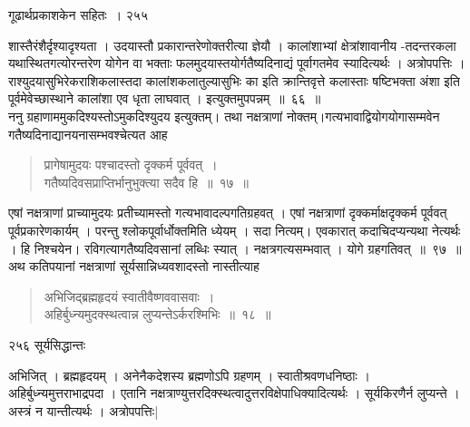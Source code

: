 \documentclass[11pt, openany]{book}
\begin{document}
\newpage


\hspace{3cm} गूढार्थप्रकाशकेन सहितः~। \hfill २५५
\vspace{1cm}


\noindent शास्तैरंशैर्दृश्यादृश्यता । उदयास्तौ प्रकारान्तरेणोक्तरीत्या ज्ञेयौ । कालांशाभ्यां क्षेत्रांशावानीय -तदन्तरकला यथास्थितगत्योरन्तरेण योगेन वा भक्ताः फलमुदयास्तयोर्गतैष्यदिनाद्यं पूर्वागतमेव स्यादित्यर्थः । अत्रोपपत्तिः । राश्युदयासुभिरेकराशिकलास्तदा कालांशकलातुल्यासुभिः का इति क्रान्तिवृत्ते कलास्ताः षष्टिभक्ता अंशा इति पूर्वमेवेच्छास्थाने कालांशा एव धृता लाघवात् । इत्युक्तमुपपन्नम्~॥~६६~॥\\
\noindent ननु ग्रहाणाममुकदिश्यस्तोऽमुकदिश्युदय इत्युक्तम्। तथा नक्षत्राणां नोक्तम्।गत्यभावाद्वियोगयोगासम्मवेन गतैष्यदिनाद्यानयनासम्भवश्चेत्यत आह \textendash

 \begin{quote}
{\ssi  प्रागेषामुदयः पश्चादस्तो दृक्कर्म पूर्ववत्~।\\ 
गतैष्यदिवसप्राप्तिर्भानुभुक्त्या सदैव हि~॥~१७~॥}
\end{quote}
 एषां नक्षत्राणां प्राच्यामुदयः प्रतीच्यामस्तो गत्यभावादल्पगतिग्रहवत् । एषां नक्षत्राणां दृक्कर्माक्षदृक्कर्म पूर्ववत् पूर्वप्रकारेणकार्यम् । परन्तु श्लोकपूर्वार्धोक्तमिति ध्येयम् । सदा नित्यम्। एवकारात् कदाचिदप्यन्यथा नेत्यर्थः । हि निश्चयेन। रविगत्यागतैष्यदिवसानां लब्धिः स्यात् । नक्षत्रगत्यसम्भवात् । योगे ग्रहगतिवत्~॥~९७~॥\\
 \noindent अथ कतिपयानां नक्षत्राणां सूर्यसान्निध्यवशादस्तो नास्तीत्याह \textendash

\begin{quote}
{\ssi अभिजिद्ब्रह्महृदयं स्वातीवैष्णववासवाः~।\\
 अहिर्बुध्न्यमुदक्स्थत्वान्न लुप्यन्तेऽर्करश्मिभिः~॥~१८~॥}
%
\end{quote}
\newpage


\noindent २५६ \hspace{4cm} सूर्यसिद्धान्तः
\vspace{1cm}


 अभिजित् । ब्रह्महृदयम् । अनेनैकदेशस्य ब्रह्मणोऽपि ग्रहणम् । स्वातीश्रवणधनिष्ठाः । अहिर्बुध्न्यमुत्तराभाद्रपदा । एतानि नक्षत्राण्युत्तरदिक्स्थत्वादुत्तरविक्षेपाधिक्यादित्यर्थः । सूर्यकिरणैर्न लुप्यन्ते । अस्त्रं न यान्तीत्यर्थः । अत्रोपपत्तिः| 
\end{document}
